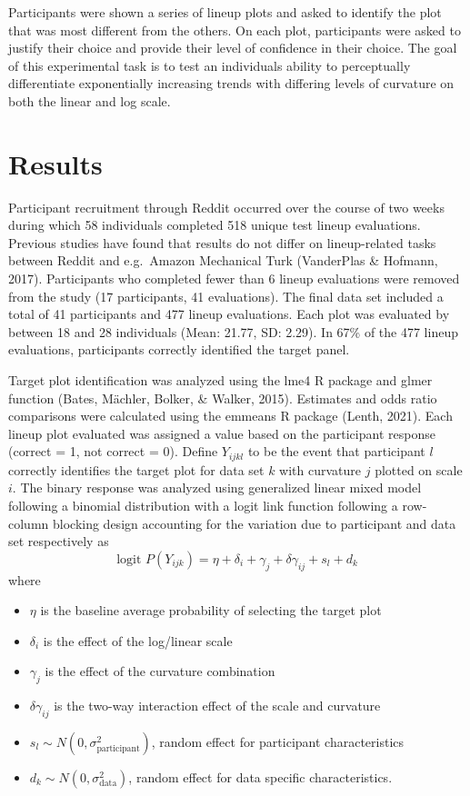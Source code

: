 \documentclass[print]{nuthesis}
\begin{document}
Participants were shown a series of lineup plots and asked to identify the plot that was most different from the others.
On each plot, participants were asked to justify their choice and provide their level of confidence in their choice.
The goal of this experimental task is to test an individuals ability to perceptually differentiate exponentially increasing trends with differing levels of curvature on both the linear and log scale.

\hypertarget{results}{%
\section{Results}\label{results}}

Participant recruitment through Reddit occurred over the course of two weeks during which 58 individuals completed 518 unique test lineup evaluations.
Previous studies have found that results do not differ on lineup-related tasks between Reddit and e.g.~Amazon Mechanical Turk (VanderPlas \& Hofmann, 2017).
Participants who completed fewer than 6 lineup evaluations were removed from the study (17 participants, 41 evaluations).
The final data set included a total of 41 participants and 477 lineup evaluations.
Each plot was evaluated by between 18 and 28 individuals (Mean: 21.77, SD: 2.29).
In 67\% of the 477 lineup evaluations, participants correctly identified the target panel.

Target plot identification was analyzed using the lme4 R package and glmer function (Bates, Mächler, Bolker, \& Walker, 2015). Estimates and odds ratio comparisons were calculated using the emmeans R package (Lenth, 2021).
Each lineup plot evaluated was assigned a value based on the participant response (correct = 1, not correct = 0).
Define \(Y_{ijkl}\) to be the event that participant \(l\) correctly identifies the target plot for data set \(k\) with curvature \(j\) plotted on scale \(i\).
The binary response was analyzed using generalized linear mixed model following a binomial distribution with a logit link function following a row-column blocking design accounting for the variation due to participant and data set respectively as
\begin{equation}
\text{logit }P(Y_{ijk}) = \eta + \delta_i + \gamma_j + \delta \gamma_{ij} + s_l + d_k
\end{equation}
\noindent where

\begin{itemize}
\item $\eta$ is the baseline average probability of selecting the target plot
\item $\delta_i$ is the effect of the log/linear scale
\item $\gamma_j$ is the effect of the curvature combination
\item $\delta\gamma_{ij}$ is the two-way interaction effect of the scale and curvature
\item $s_l \sim N(0,\sigma^2_\text{participant})$, random effect for participant characteristics
\item $d_k \sim N(0,\sigma^2_{\text{data}})$, random effect for data specific characteristics. 
\end{itemize}
\end{document}
